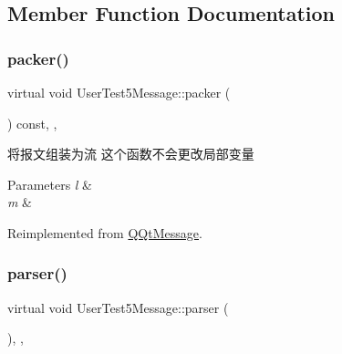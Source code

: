 \subsection{Member Function Documentation}
\mbox{\label{class_user_test5_message_abeaaf86a18f7483f616437ef51fd393c}} 
\subsubsection{\texorpdfstring{packer()}{packer()}}
{\footnotesize\ttfamily virtual void User\+Test5\+Message\+::packer (\begin{DoxyParamCaption}\item[{Q\+Byte\+Array \&}]{ }\end{DoxyParamCaption}) const\hspace{0.3cm}{\ttfamily [inline]}, {\ttfamily [override]}, {\ttfamily [virtual]}}



将报文组装为流 这个函数不会更改局部变量 


\begin{DoxyParams}{Parameters}
{\em l} & \\
\hline
{\em m} & \\
\hline
\end{DoxyParams}


Reimplemented from \mbox{\hyperlink{class_q_qt_message_af1885c2c3628495808dca66ee8d72e14}{Q\+Qt\+Message}}.

\mbox{\label{class_user_test5_message_ac73d80522b3e900250588f84ee69b25f}} 
\subsubsection{\texorpdfstring{parser()}{parser()}}
{\footnotesize\ttfamily virtual void User\+Test5\+Message\+::parser (\begin{DoxyParamCaption}\item[{const Q\+Byte\+Array \&}]{ }\end{DoxyParamCaption})\hspace{0.3cm}{\ttfamily [inline]}, {\ttfamily [override]}, {\ttfamily [virtual]}}



